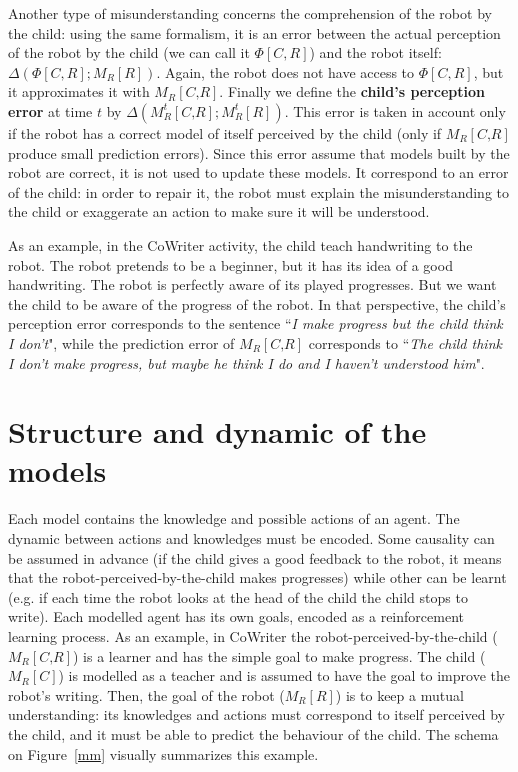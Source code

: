 \documentclass[conference]{IEEEtran}
\begin{document}
Another type of misunderstanding concerns the comprehension of the robot by the child: using the same formalism, it is an error between the actual perception of the robot by the child (we can call it $\Phi[C,R]$) and the robot itself: $\Delta \left(\Phi[C,R] ; M_R\left[\textit{R}\right]\right)$. Again, the robot does not have access to $\Phi[C,R]$, but it approximates it with $ M_R\left[\textit{C,R}\right]$. Finally we define the \textbf{child's perception error} at time $t$ by $\Delta \left(M^t_R\left[\textit{C,R}\right] ; M^t_R\left[\textit{R}\right]\right)$. This error is taken in account only if the robot has a correct model of itself perceived by the child (only if $M_R\left[\textit{C,R}\right]$ produce small prediction errors). Since this error assume that models built by the robot are correct, it is not used to update these models. It correspond to an error of the child: in order to repair it, the robot must explain the misunderstanding to the child or exaggerate an action to make sure it will be understood.

As an example, in the CoWriter activity, the child teach handwriting to the robot. The robot pretends to be a beginner, but it has its idea of a good handwriting. The robot is perfectly aware of its played progresses. But we want the child to be aware of the progress of the robot. In that perspective, the child's perception error corresponds to the sentence ``\textit{I make progress but the child think I don't}", while the prediction error of $M_R\left[\textit{C,R}\right]$ corresponds to ``\textit{The child think I don't make progress, but maybe he think I do and I haven't understood him}".  

\section{Structure and dynamic of the models}
Each model contains the knowledge and possible actions of an agent. The dynamic between actions and knowledges must be encoded. Some causality can be assumed in advance (if the child gives a good feedback to the robot, it means that the robot-perceived-by-the-child makes progresses) while other can be learnt (e.g. if each time the robot looks at the head of the child the child stops to write). Each modelled agent has its own goals, encoded as a reinforcement learning process. As an example, in CoWriter the robot-perceived-by-the-child ($ M_R\left[\textit{C,R}\right]$) is a learner and has the simple goal to make progress. The child ($ M_R\left[\textit{C}\right]$) is modelled as a teacher and is assumed to have the goal to improve the robot's writing. Then, the goal of the robot ($ M_R\left[\textit{R}\right]$) is to keep a mutual understanding: its knowledges and actions must correspond to itself perceived by the child, and it must be able to predict the behaviour of the child. The schema on Figure~\ref{mm} visually summarizes this example.
\end{document}
